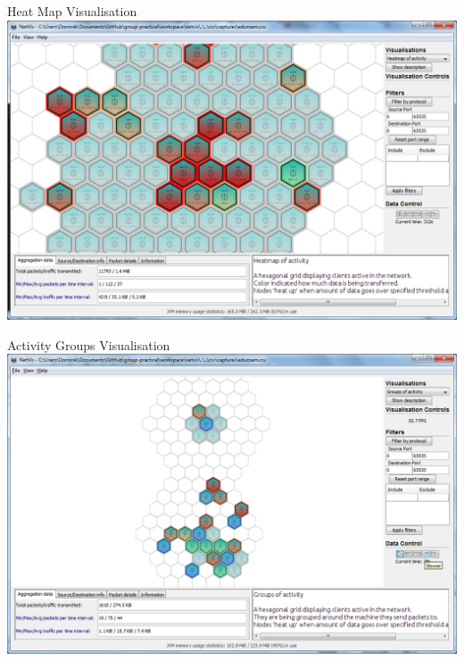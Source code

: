 \documentclass{beamer}
\begin{document}
    \begin{frame}{Heat Map Visualisation}
	\includegraphics[width=\textwidth,keepaspectratio]{img/HeatMap.png}
    \end{frame}

    \begin{frame}{Activity Groups Visualisation}
	\includegraphics[width=\textwidth,keepaspectratio]{img/Groups.png}
    \end{frame}
\end{document}
